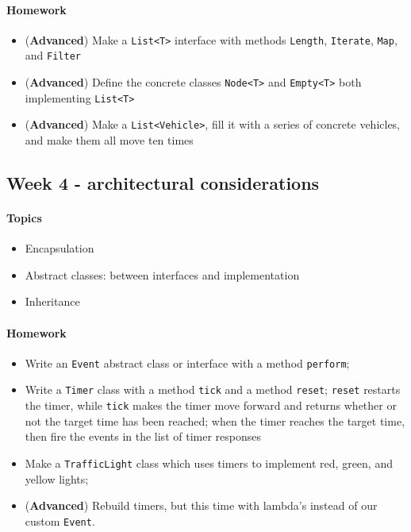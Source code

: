 		\paragraph*{Homework}
		\begin{itemize}
			\item (\textbf{Advanced}) Make a \texttt{List<T>} interface with methods \texttt{Length}, \texttt{Iterate}, \texttt{Map}, and \texttt{Filter}
			\item (\textbf{Advanced}) Define the concrete classes \texttt{Node<T>} and \texttt{Empty<T>} both implementing \texttt{List<T>}
			\item (\textbf{Advanced}) Make a \texttt{List<Vehicle>}, fill it with a series of concrete vehicles, and make them all move ten times
		\end{itemize}
		
		
		
		\subsection{Week 4 - architectural considerations}
		
		\paragraph*{Topics}			
		\begin{itemize}
			\item Encapsulation
			\item Abstract classes: between interfaces and implementation
			\item Inheritance
		\end{itemize}
		
		\paragraph*{Homework}
		\begin{itemize}
			\item Write an \texttt{Event} abstract class or interface with a method \texttt{perform}; 
			\item Write a \texttt{Timer} class with a method \texttt{tick} and a method \texttt{reset}; \texttt{reset} restarts the timer, while \texttt{tick} makes the timer move forward and returns whether or not the target time has been reached; when the timer reaches the target time, then fire the events in the list of timer responses
			\item Make a \texttt{TrafficLight} class which uses timers to implement red, green, and yellow lights;
			\item (\textbf{Advanced}) Rebuild timers, but this time with lambda's instead of our custom \texttt{Event}.
		\end{itemize}
		
